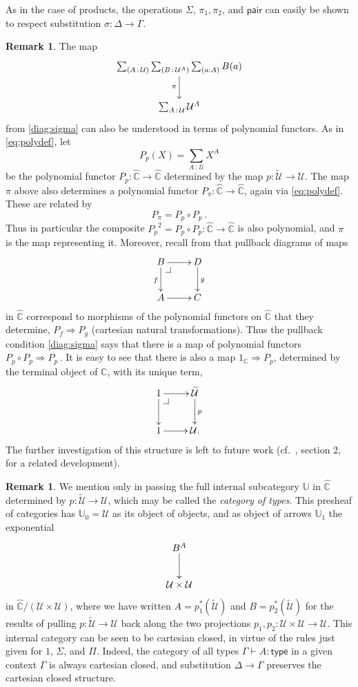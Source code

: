 \documentclass[12pt]{article}
\makeatletter
\newcommand{\C}{\ensuremath{\mathbb{C}}}
\newcommand{\pbcorner}[1][dr]{\save*!/#1-1.2pc/#1:(-1,1)@^{|-}\restore}
\newcommand{\G}{\ensuremath{\Gamma}}
\newcommand{\type}{\mathsf{type}}
\newcommand{\types}[2]{#1 \vdash #2:\type}
\newcommand{\Gtypes}[1]{\types{\Gamma}{#1}}
\newcommand{\ty}{\ensuremath{\,:\,}}
\newcommand{\pairmap}{\ensuremath{\mathsf{pair}}}
\newcommand{\U}{\ensuremath{\mathcal{U}}}
\newcommand{\UU}{\ensuremath{\widetilde{\mathcal{U}}}}
\theoremstyle{definition}
\newtheorem{remark}[theorem]{Remark}
\makeatother
\begin{document}
As in the case of products, the operations $\Sigma$, $\pi_1, \pi_2$, and $\pairmap$ can easily be shown to respect substitution $\sigma: \Delta\to\G$.
 
\begin{remark}
The map 
%
\begin{equation}
\xymatrix{
 \sum_{(A\ty\U)}\sum_{(B\ty\U^{A})}\sum_{(a : A)}B(a) \ar[d]_{\pi} \\
\sum_{A\ty\U}\U^{A}
}
\end{equation}
%
from \eqref{diag:sigma} can also be understood  in terms of polynomial functors.  As in \eqref{eq:polydef}, let $$P_p(X) = \sum_{A\ty\U}X^{A}$$ be the polynomial functor $P_p : \widehat{\C}\to\widehat{\C}$ determined by the map $p : \UU\to\U$.  The map $\pi$ above also determines a polynomial functor $P_\pi : \widehat{\C}\to\widehat{\C}$, again via \eqref{eq:polydef}.  These are related by
\[
P_\pi = P_p \circ P_p\ .
\]
Thus in particular the composite ${P_p}^2 = P_p\circ P_p : \widehat{\C}\to\widehat{\C}$ is also polynomial, and $\pi$ is the map representing it.  Moreover, recall from \cite{GK} that pullback diagrams of maps
%
\begin{equation*}\label{diag:pbpoly}
\xymatrix{
B \ar[d]_{f} \ar[r] \pbcorner &  D \ar[d]^{g}\\
A \ar[r] & C }
\end{equation*}
%
in $\widehat{\C}$ correspond to morphisms of the polynomial functors on $\widehat{\C}$ that they determine, $P_f \Rightarrow P_g$ (cartesian natural transformations).
Thus the pullback condition \eqref{diag:sigma} says that there is a map of polynomial functors $P_p \circ P_p \Rightarrow P_p$\,.  It is easy to see that there is also a map $1_\C \Rightarrow P_p$, determined by the terminal object of \C, with its unique term,
%
\begin{equation}
\xymatrix{
1 \ar[d] \ar[r] \pbcorner &  \UU \ar[d]^{p}\\
1 \ar[r] & \U .}
\end{equation}
%
The further investigation of this structure is left to future work (cf.~\cite{PTJ:BD}, section 2, for a related development).
\end{remark}

\begin{remark}\label{remark:catoftypes}
We mention only in passing the full internal subcategory $\mathbb{U}$ in $\widehat{\C}$ determined by $p : \UU\to\U$, which may be called the \emph{category of types}.  This presheaf of categories has $\mathbb{U}_0 = \U$ as its object of objects, and as object of arrows $\mathbb{U}_1$ the exponential
\[
\xymatrix{
B^A \ar[d] \\
\U \times \U}
\]
in $\widehat{\C}/(\U \times \U)$, where we have written $A = p_1^*(\UU)$ and $B = p_2^*(\UU)$ for the results of pulling $p : \UU \to \U$ back along the two projections $p_1, p_2 : \U \times \U \to \U$. This internal category can be seen to be cartesian closed, in virtue of the rules just given for $1$, $\Sigma$, and $\Pi$.  Indeed, the category of all types $\Gtypes{A}$ in a given context $\G$ is always cartesian closed, and substitution $\Delta \to \G$ preserves the cartesian closed structure.
\end{remark}
\end{document}
